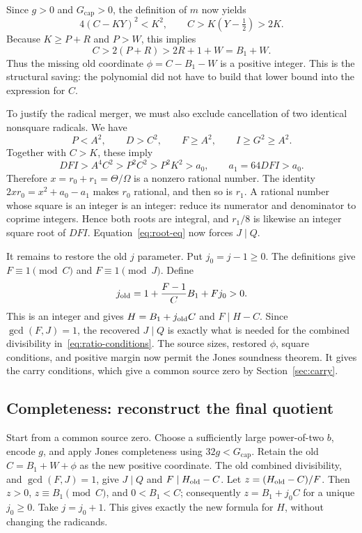 \documentclass[11pt]{article}
\newcommand{\Gcap}{G_{\mathrm{cap}}}
\theoremstyle{remark}\newtheorem{remark}[theorem]{Remark}
\begin{document}
Since $g>0$ and $\Gcap>0$, the definition of $m$ now yields
\[
 4(C-KY)^2<K^2,\qquad C>K(Y-\tfrac12)>2K.
\]
Because $K\geq P+R$ and $P>W$, this implies
\begin{equation}\label{eq:restorephi}
 C>2(P+R)>2R+1+W=B_1+W.
\end{equation}
Thus the missing old coordinate $\phi=C-B_1-W$ is a positive integer.
This is the structural saving: the polynomial did not have to build that
lower bound into the expression for $C$.

To justify the radical merger, we must also exclude cancellation of two
identical nonsquare radicals. We have
\[
 P<A^2,\qquad D>C^2,\qquad F\geq A^2,\qquad I\geq G^2\geq A^2.
\]
Together with $C>K$, these imply
\begin{equation}\label{eq:separate}
 DFI>A^4C^2>P^2C^2>P^2K^2>a_0,
 \qquad a_1=64DFI>a_0.
\end{equation}
Therefore $x=r_0+r_1=\Theta/\Omega$ is a nonzero rational number.
The identity $2xr_0=x^2+a_0-a_1$ makes $r_0$ rational, and then so is
$r_1$. A rational number whose square is an integer is an integer: reduce
its numerator and denominator to coprime integers. Hence both roots are
integral, and $r_1/8$ is likewise an integer square root of $DFI$.
Equation~\eqref{eq:root-eq} now forces $J\mid Q$.

It remains to restore the old $j$ parameter. Put $j_0=j-1\geq0$.
The definitions give $F\equiv1\pmod C$ and $F\equiv1\pmod J$. Define
\[
 j_{\rm old}=1+\frac{F-1}{C}B_1+Fj_0>0.
\]
This is an integer and gives $H=B_1+j_{\rm old}C$ and $F\mid H-C$.
Since $\gcd(F,J)=1$, the recovered $J\mid Q$ is exactly what is needed
for the combined divisibility in~\eqref{eq:ratio-conditions}. The source
sizes, restored $\phi$, square conditions, and positive margin now permit
the Jones soundness theorem. It gives the carry conditions, which give
a common source zero by Section~\ref{sec:carry}.

\subsection{Completeness: reconstruct the final quotient}

Start from a common source zero. Choose a sufficiently large power-of-two
$b$, encode $g$, and apply Jones completeness using $32g<\Gcap$.
Retain the old $C=B_1+W+\phi$ as the new positive coordinate.
The old combined divisibility, and $\gcd(F,J)=1$, give $J\mid Q$ and
$F\mid H_{\rm old}-C$. Let $z=(H_{\rm old}-C)/F$. Then $z>0$,
$z\equiv B_1\pmod C$, and $0<B_1<C$; consequently
$z=B_1+j_0C$ for a unique $j_0\geq0$. Take $j=j_0+1$.
This gives exactly the new formula for $H$, without changing the radicands.
\end{document}
